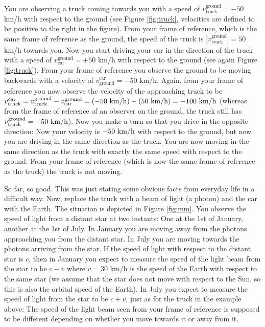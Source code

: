 {\begin{multicols}{2}
You are observing a truck coming towards you with a speed of $v_\mathrm{truck}^\mathrm{ground}=-50$ km/h with respect to the ground (see Figure \ref{fig:truck}, velocities are defined to be positive to the right in the figure). From your frame of reference, which is the same frame of reference as the ground, the speed of the truck is $|v_\mathrm{truck}^\mathrm{ground}|=50$ km/h towards you. Now you start driving your car in the direction of the truck with a speed of $v_\mathrm{car}^\mathrm{ground}=+50$ km/h with respect to the ground (see again Figure \ref{fig:truck}). From your frame of reference you observe the ground to be moving backwards with a velocity of $v_\mathrm{ground}^\mathrm{car}=-50$ km/h. Again, from your frame of reference you now observe the velocity of the approaching truck to be $v_\mathrm{truck}^\mathrm{car}=v_\mathrm{truck}^\mathrm{ground}-v_\mathrm{car}^\mathrm{ground}=(-50{\rm \ km/h})-(50{\rm \ km/h})=-100{\rm \ km/h}$ (whereas from the frame of reference of an observer on the ground, the truck still has $v_\mathrm{truck}^\mathrm{ground}=-50{\rm \ km/h}$). Now you make a turn so that you drive in the opposite direction: Now your velocity is $-50{\rm \ km/h}$ with respect to the ground, but now you are driving in the same direction as the truck. You are now moving in the same direction as the truck with exactly the same speed with respect to the ground. From your frame of reference (which is now the same frame of reference as the truck) the truck is not moving.

So far, so good. This was just stating some obvious facts from everyday life in a difficult way. Now, replace the truck with a beam of light (a photon) and the car with the Earth. The situation is depicted in Figure \ref{fig:mm}. You observe the speed of light from a distant star at two instants: One at the 1st of January, another at the 1st of July. In January you are moving away from the photons approaching you from the distant star. In July you are moving towards the photons arriving from the star. If the speed of light with respect to the distant star is $c$, then in January you expect to measure the speed of the light beam from the star to be $c-v$ where $v=30$ km/h is the speed of the Earth with respect to the same star (we assume that the star does not move with respect to the Sun, so this is also the orbital speed of the Earth). In July you expect to measure the speed of light from the star to be $c+v$, just as for the truck in the example above: The speed of the light beam seen from your frame of reference is supposed to be different depending on whether you move towards it or away from it.


\end{multicols}}
